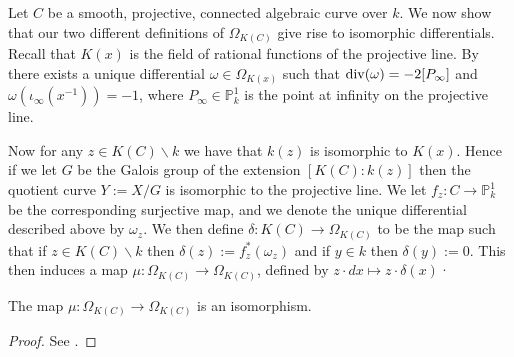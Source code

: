 \begin{comment}
We now show the equivalence of our two definitions of differential.

Recall that for a curve $C$ a derivation of $K(C)$ is a $k$-linear map $d\colon K(C) \rightarrow M$ for some $K(C)$-module $M$ such that $d(ab) = ad(b) + d(a)b$ for all $a,b\in K(C)$.
Note that of course, as $K(C)$ is a field, $M$ is a vector space, but this does hold more generally for rings and modules.

By \cite[Prop. IV.1.4]{stichtenoth}, for each $x\in K(C)\backslash k$ there exists a unique derivation $d_x\colon K(C) \rightarrow K(C)$ such that $d_x(x) = 1$, which we call the {\em derivation with respect to $x$}.

If we let $Z:= \{(u,x)\in K(C)\times K(C) |x\notin k\}$, then we can define a relation on the elements of $Z$ by letting $(u,x) \sim (v,y)$ if $v = u\cdot d_y(x)$.
Then we denote the equivalence class of $(1,x)\in Z$ by $dx$.
It can then be shown that $Z$, when quotiented by the above relation, has the universal property of $\Omega_C$, and hence is isomorphic to $\Omega_C$ as a $K(C)$-module (see \cite[IV.1.8]{stichtenoth}).
\end{comment}

Let $C$ be a smooth, projective, connected algebraic curve over $k$.
We now show that our two different definitions of $\Omega_{K(C)}$ give rise to isomorphic differentials.
Recall that $K(x)$ is the field of rational functions of the projective line.
By \cite[Prop. I.7.4]{stichtenoth} there exists a unique differential $\omega \in \Omega_{K(x)}$ such that $\operatorname{div} (\omega) = -2[P_{\infty}]$ and $\omega(\iota_\infty(x^{-1})) = -1$, where $P_\infty \in \mathbb P_k^1$ is the point at infinity on the projective line.


Now for any $z\in K(C) \backslash k$ we have that $k(z)$ is isomorphic to $K(x)$.
Hence if we let $G$ be the Galois group of the extension $[K(C):k(z)]$ then the quotient curve $Y:=X/G$ is isomorphic to the projective line.
We let $f_z\colon C \rightarrow \mathbb P_k^1$ be the corresponding surjective map, and we denote the unique differential described above by $\omega_z$.
We then define $\delta\colon K(C) \rightarrow \Omega_{K(C)}$ to be the map such that if $z\in K(C)\backslash k$ then $\delta (z) := f_z^*(\omega_z)$ and if $y\in k$ then $\delta(y):=0$.
This then induces a map $\mu\colon \Omega_{K(C)} \rightarrow \Omega_{K(C)}$, defined by $z\cdot dx \mapsto z\cdot \delta(x)$·

\begin{thm}
The map $\mu\colon \Omega_{K(C)} \rightarrow \Omega_{K(C)}$ is an isomorphism.
\end{thm}
\begin{proof}
See \cite[Thm. IV.3.2]{stichtenoth}.
\end{proof}

